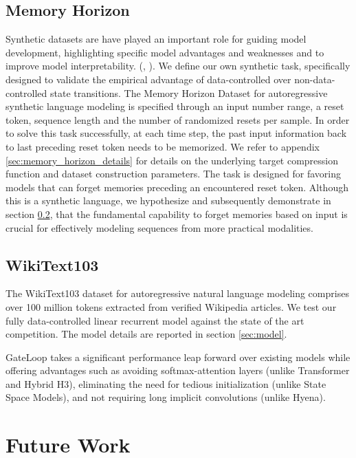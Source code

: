 \subsection{Memory Horizon} Synthetic datasets are have played an important role for guiding model development, highlighting specific model advantages and weaknesses and to improve model interpretability. (\cite{olsson2022incontext}, \cite{fu2023hungry}). We define our own synthetic task, specifically designed to validate the empirical advantage of data-controlled over non-data-controlled state transitions. The Memory Horizon Dataset for autoregressive synthetic language modeling is specified through an input number range, a reset token, sequence length and the number of randomized resets per sample. In order to solve this task successfully, at each time step, the past input information back to last preceding reset token needs to be memorized. We refer to appendix \ref{sec:memory_horizon_details} for details on the underlying target compression function and dataset construction parameters. The task is designed for favoring models that can forget memories preceding an encountered reset token. Although this is a synthetic language, we hypothesize and subsequently demonstrate in section \ref{subsec:WikiText103}, that the fundamental capability to forget memories based on input is crucial for effectively modeling sequences from more practical modalities.

\subsection{WikiText103}\label{subsec:WikiText103}

The WikiText103 dataset for autoregressive natural language modeling comprises over 100 million tokens extracted from verified Wikipedia articles. We test our fully data-controlled linear recurrent model against the state of the art competition. The model details are reported in section \ref{sec:model}. 

GateLoop takes a significant performance leap forward over existing models while offering advantages such as avoiding softmax-attention layers (unlike Transformer and Hybrid H3), eliminating the need for tedious initialization (unlike State Space Models), and not requiring long implicit convolutions (unlike Hyena). 

\section{Future Work}

